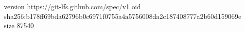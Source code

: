 version https://git-lfs.github.com/spec/v1
oid sha256:b178ff69bda62796b0c6971f0755a4a5756008da2c187408777a2b60d159069e
size 87540
